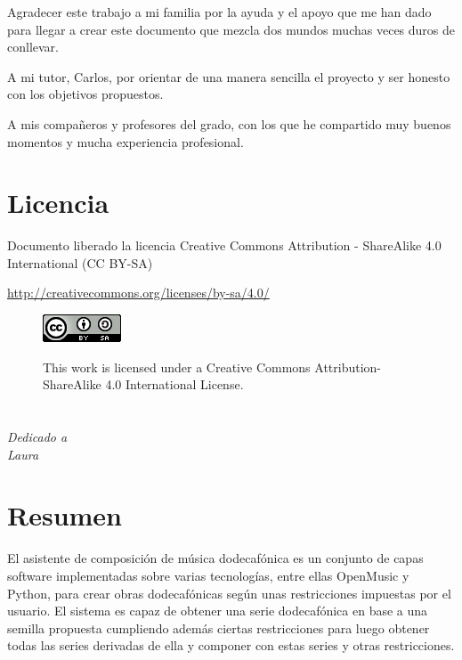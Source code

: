 \documentclass[a4paper,openany,oneside,12pt]{book}
\begin{document}
Agradecer este trabajo a mi familia por la ayuda y el apoyo que me han dado para llegar a crear este documento que mezcla dos mundos muchas veces duros de conllevar.

A mi tutor, Carlos, por orientar de una manera sencilla el proyecto y ser honesto con los objetivos propuestos.

A mis compañeros y profesores del grado, con los que he compartido muy buenos momentos y mucha experiencia profesional.

\chapter*{Licencia}
Documento liberado la licencia Creative Commons Attribution - ShareAlike 4.0 International (CC BY-SA)

\url{http://creativecommons.org/licenses/by-sa/4.0/}


\begin{figure}
\centering
\includegraphics{img/cc.png} 

This work is licensed under a Creative Commons Attribution-ShareAlike 4.0 International License.
\end{figure}

\chapter*{}
\begin{flushright}
\textit{Dedicado a \\
Laura}
\end{flushright}


\chapter*{Resumen}

El asistente de composición de música dodecafónica es un conjunto de capas software implementadas sobre varias tecnologías, entre ellas OpenMusic y Python, para crear obras dodecafónicas según unas restricciones impuestas por el usuario. El sistema es capaz de obtener una serie dodecafónica en base a una semilla propuesta cumpliendo además ciertas restricciones para luego obtener todas las series derivadas de ella y componer con estas series y otras restricciones.
\end{document}
